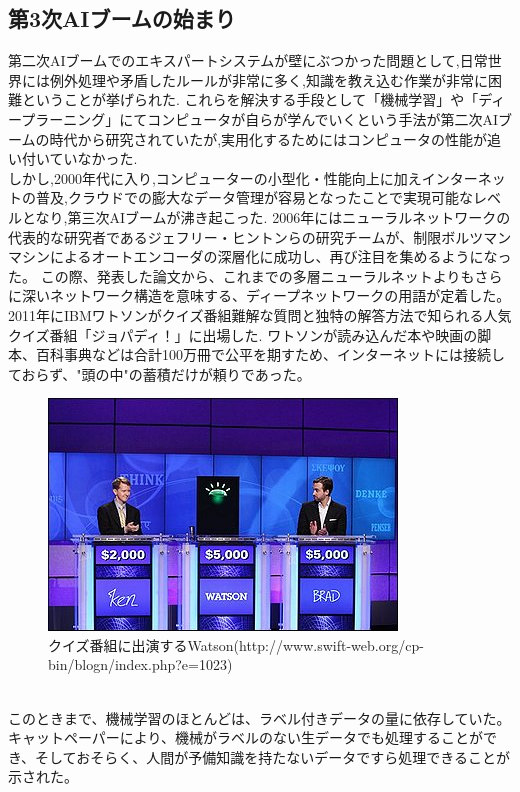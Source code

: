 \subsection{第3次AIブームの始まり}
第二次AIブームでのエキスパートシステムが壁にぶつかった問題として,日常世界には例外処理や矛盾したルールが非常に多く,知識を教え込む作業が非常に困難ということが挙げられた.
これらを解決する手段として「機械学習」や「ディープラーニング」にてコンピュータが自らが学んでいくという手法が第二次AIブームの時代から研究されていたが,実用化するためにはコンピュータの性能が追い付いていなかった.\\
しかし,2000年代に入り,コンピューターの小型化・性能向上に加えインターネットの普及,クラウドでの膨大なデータ管理が容易となったことで実現可能なレベルとなり,第三次AIブームが沸き起こった.
2006年にはニューラルネットワークの代表的な研究者であるジェフリー・ヒントンらの研究チームが、制限ボルツマンマシンによるオートエンコーダの深層化に成功し、再び注目を集めるようになった。
この際、発表した論文から、これまでの多層ニューラルネットよりもさらに深いネットワーク構造を意味する、ディープネットワークの用語が定着した。
2011年にIBMワトソンがクイズ番組難解な質問と独特の解答方法で知られる人気クイズ番組「ジョパディ！」に出場した.
ワトソンが読み込んだ本や映画の脚本、百科事典などは合計100万冊で公平を期すため、インターネットには接続しておらず、"頭の中"の蓄積だけが頼りであった。
\begin{figure}[!ht]
    \begin{screen}
    \begin{center}
        \includegraphics[scale=1.0, clip]{./img/Watson.jpg}
        \caption{クイズ番組に出演するWatson\newline(http://www.swift-web.org/cp-bin/blogn/index.php?e=1023)}
        \label{fig:クイズ番組に出演するWatson}
    \end{center}
\end{screen}
\end{figure}\\
このときまで、機械学習のほとんどは、ラベル付きデータの量に依存していた。
キャットペーパーにより、機械がラベルのない生データでも処理することができ、そしておそらく、人間が予備知識を持たないデータですら処理できることが示された。
